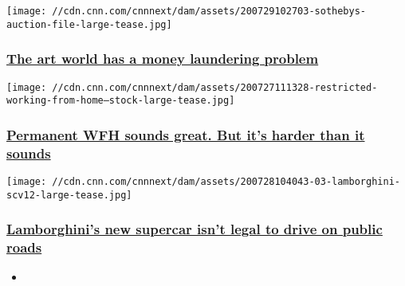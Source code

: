 \href{/2020/07/29/business/art-money-laundering-sanctions-senate/index.html}{}

\texttt{[image: //cdn.cnn.com/cnnnext/dam/assets/200729102703-sothebys-auction-file-large-tease.jpg]}

\hypertarget{the-art-world-has-a-money-laundering-problem}{%
\subsubsection{\texorpdfstring{\href{/2020/07/29/business/art-money-laundering-sanctions-senate/index.html}{The
art world has a money laundering
problem}}{The art world has a money laundering problem}}\label{the-art-world-has-a-money-laundering-problem}}

\href{/2020/07/29/success/work-from-home-sustainable/index.html}{}

\texttt{[image: //cdn.cnn.com/cnnnext/dam/assets/200727111328-restricted-working-from-home---stock-large-tease.jpg]}

\hypertarget{permanent-wfh-sounds-great-but-its-harder-than-it-sounds}{%
\subsubsection{\texorpdfstring{\href{/2020/07/29/success/work-from-home-sustainable/index.html}{Permanent
WFH sounds great. But it's harder than it
sounds}}{Permanent WFH sounds great. But it's harder than it sounds}}\label{permanent-wfh-sounds-great-but-its-harder-than-it-sounds}}

\href{/2020/07/29/cars/lamborghini-scv12/index.html}{}

\texttt{[image: //cdn.cnn.com/cnnnext/dam/assets/200728104043-03-lamborghini-scv12-large-tease.jpg]}

\hypertarget{lamborghinis-new-supercar-isnt-legal-to-drive-on-public-roads}{%
\subsubsection{\texorpdfstring{\href{/2020/07/29/cars/lamborghini-scv12/index.html}{Lamborghini's
new supercar isn't legal to drive on public
roads}}{Lamborghini's new supercar isn't legal to drive on public roads}}\label{lamborghinis-new-supercar-isnt-legal-to-drive-on-public-roads}}

\begin{itemize}
\item
\end{itemize}

